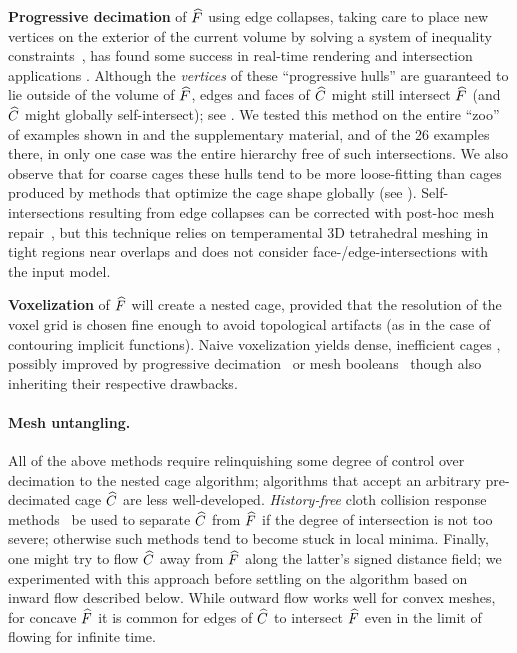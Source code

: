 \textbf{Progressive decimation} of $\widehat{F}$ using edge collapses, taking care
to place new vertices on the exterior of the current volume by solving a system
of inequality constraints~\cite{Sander:2000:SC}, has found some success in
real-time rendering and intersection applications \cite{Platis:CGF}.  Although
the \emph{vertices} of these ``progressive hulls'' are guaranteed to lie
outside of the volume of $\widehat{F}$, edges and faces of $\widehat{C}$ might still
intersect $\widehat{F}$ (and $\widehat{C}$ might globally self-intersect); see
. We tested this method on the entire ``zoo'' of
examples shown in  and the supplementary material, and of the 26
examples there, in only one case was the entire hierarchy free of such
intersections. We also observe that for coarse cages these hulls tend to be
more loose-fitting than cages produced by methods that optimize the cage shape
globally (see ).  Self-intersections resulting from
edge collapses can be corrected with post-hoc mesh repair~\cite{Deng:2011vr},
but this technique relies on temperamental 3D tetrahedral meshing in tight
regions near overlaps and does not consider face-/edge-intersections with
the input model.

\textbf{Voxelization} of $\widehat{F}$ will create a nested cage, provided that
the resolution of the voxel grid is chosen fine enough to avoid topological
artifacts (as in the case of contouring implicit functions). Naive voxelization
yields dense, inefficient cages \cite{Mehra:2009:AMS}, possibly improved by
progressive decimation~\cite{Xian:2009} or mesh booleans~\cite{Xian:2015}
though also inheriting their respective drawbacks.

\paragraph{Mesh untangling.}
%
All of the above methods require relinquishing some degree of control over
decimation to the nested cage algorithm; algorithms that accept an arbitrary
pre-decimated cage $\widehat{C}$ are less well-developed. \emph{History-free} cloth
collision response methods~\cite{Baraff:2003:UC,Volino2006,Ye2012,Wicke2006}
be used to separate $\widehat{C}$ from $\widehat{F}$ if the degree of intersection is
not too severe; otherwise such methods tend to become stuck in local minima.
Finally, one might try to flow $\widehat{C}$ away from $\widehat{F}$ along the latter's
signed distance field; we experimented with this approach before settling on
the algorithm based on inward flow described below. While outward flow works
well for convex meshes, for concave $\widehat{F}$ it is common for edges of $\widehat{C}$
to intersect $\widehat{F}$ even in the limit of flowing for infinite time.

